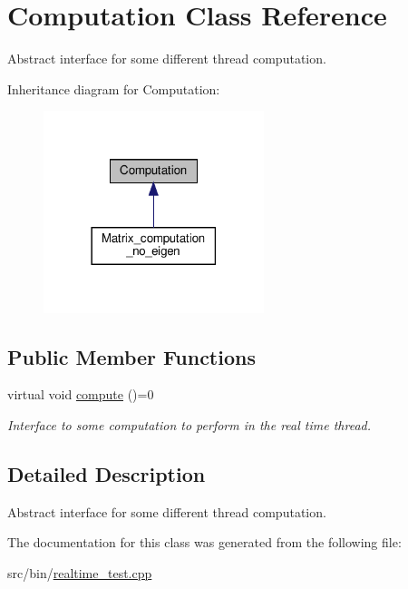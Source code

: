 \hypertarget{classComputation}{}\section{Computation Class Reference}
\label{classComputation}


Abstract interface for some different thread computation.  




Inheritance diagram for Computation\+:
\nopagebreak
\begin{figure}[H]
\begin{center}
\leavevmode
\includegraphics[width=182pt]{classComputation__inherit__graph}
\end{center}
\end{figure}
\subsection*{Public Member Functions}
\begin{DoxyCompactItemize}
\item 
\mbox{\label{classComputation_a1b2d101b74dadde0624f837a62c051c6}} 
virtual void \hyperlink{classComputation_a1b2d101b74dadde0624f837a62c051c6}{compute} ()=0
\begin{DoxyCompactList}\small\item\em Interface to some computation to perform in the real time thread. \end{DoxyCompactList}\end{DoxyCompactItemize}


\subsection{Detailed Description}
Abstract interface for some different thread computation. 

The documentation for this class was generated from the following file\+:\begin{DoxyCompactItemize}
\item 
src/bin/\hyperlink{realtime__test_8cpp}{realtime\+\_\+test.\+cpp}\end{DoxyCompactItemize}
